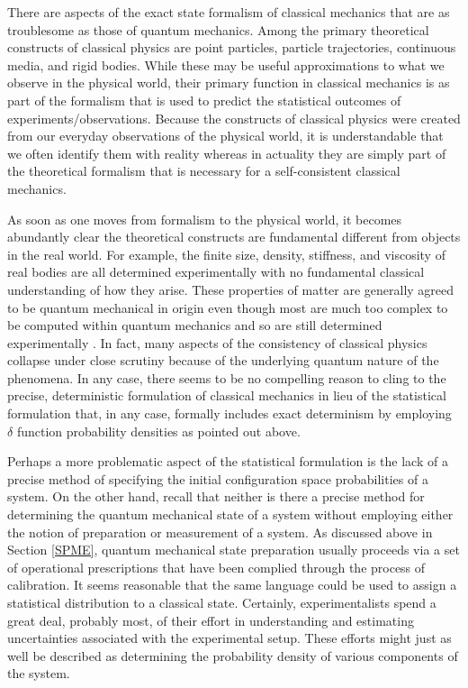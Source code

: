 \documentclass [12pt]{revtex4}
\begin{document}
There are aspects of the exact state formalism of classical mechanics
that are as troublesome as those of quantum mechanics.  Among the primary
theoretical constructs of classical physics are point particles, particle
trajectories, continuous media, and rigid bodies.  While these may be useful
approximations to what we observe in the physical world, their primary function
in classical mechanics is as part of the formalism that is used to predict
the statistical outcomes of experiments/observations.  Because the constructs
of classical physics were created from our everyday observations of the physical
world, it is understandable that we often identify them with reality whereas
in actuality they are simply part of the theoretical formalism that is necessary
for a self-consistent classical mechanics.

As soon as one moves from formalism to the physical world, it becomes
abundantly clear the theoretical constructs are fundamental different from
objects in the real world.  For example, the finite size, density, stiffness,
and viscosity of real bodies are all determined experimentally with no
fundamental {classical} understanding of how they arise. These properties
of matter are generally agreed to be quantum mechanical in origin
even though most are much too complex to be computed within quantum mechanics
and so are still determined experimentally \cite{fdr}. In fact, many aspects
of the consistency of classical physics collapse under close scrutiny because
of the underlying quantum nature of the phenomena. In any case, there seems
to be no compelling reason to cling to the precise, deterministic formulation
of classical mechanics in lieu of the statistical formulation that, in any
case, formally includes exact determinism by employing $\delta $ function
probability densities as pointed out above.

Perhaps a more problematic aspect of the statistical formulation is
the lack of a precise method of specifying the initial configuration
space probabilities of a system. On the other hand, recall that
neither is there a precise method for determining the quantum
mechanical state of a system without employing either the notion of
{preparation} or {measurement} of a system. As
discussed above in Section \ref{SPME}, quantum mechanical state preparation
usually proceeds via a set of operational prescriptions that have
been complied through the process of calibration. It seems
reasonable that the same language could be used to assign a
statistical distribution to a classical state. Certainly,
experimentalists spend a great deal, probably most, of their effort
in understanding and estimating uncertainties associated with the
experimental setup. These efforts might just as well be described as
determining the probability density of various components of the
system.
\end{document}
